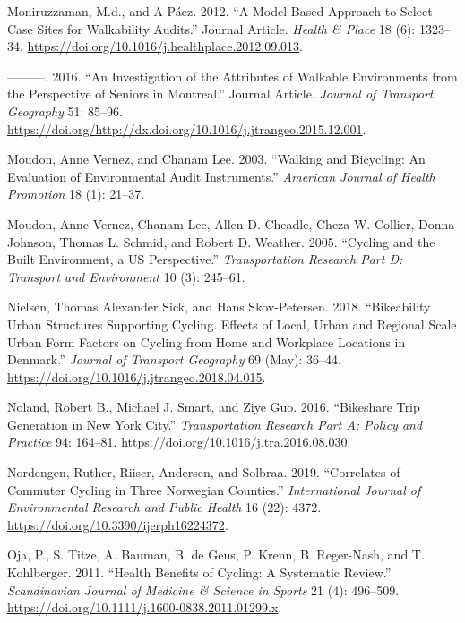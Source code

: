 \documentclass[smallextended]{svjour3}       %
\begin{document}
\leavevmode\hypertarget{ref-Moniruzzaman2012}{}%
Moniruzzaman, M.d., and A Páez. 2012. ``A Model-Based Approach to Select
Case Sites for Walkability Audits.'' Journal Article. \emph{Health \&
Place} 18 (6): 1323--34.
\url{https://doi.org/10.1016/j.healthplace.2012.09.013}.

\leavevmode\hypertarget{ref-Moniruzzaman2016}{}%
---------. 2016. ``An Investigation of the Attributes of Walkable
Environments from the Perspective of Seniors in Montreal.'' Journal
Article. \emph{Journal of Transport Geography} 51: 85--96.
\url{https://doi.org/http://dx.doi.org/10.1016/j.jtrangeo.2015.12.001}.

\leavevmode\hypertarget{ref-Moudon2003walking}{}%
Moudon, Anne Vernez, and Chanam Lee. 2003. ``Walking and Bicycling: An
Evaluation of Environmental Audit Instruments.'' \emph{American Journal
of Health Promotion} 18 (1): 21--37.

\leavevmode\hypertarget{ref-moudonCyclingBuiltEnvironment2005a}{}%
Moudon, Anne Vernez, Chanam Lee, Allen D. Cheadle, Cheza W. Collier,
Donna Johnson, Thomas L. Schmid, and Robert D. Weather. 2005. ``Cycling
and the Built Environment, a US Perspective.'' \emph{Transportation
Research Part D: Transport and Environment} 10 (3): 245--61.

\leavevmode\hypertarget{ref-Nielsen2018}{}%
Nielsen, Thomas Alexander Sick, and Hans Skov-Petersen. 2018.
``Bikeability Urban Structures Supporting Cycling. Effects of Local,
Urban and Regional Scale Urban Form Factors on Cycling from Home and
Workplace Locations in Denmark.'' \emph{Journal of Transport Geography}
69 (May): 36--44. \url{https://doi.org/10.1016/j.jtrangeo.2018.04.015}.

\leavevmode\hypertarget{ref-nolandBikeshareTripGeneration2016}{}%
Noland, Robert B., Michael J. Smart, and Ziye Guo. 2016. ``Bikeshare
Trip Generation in New York City.'' \emph{Transportation Research Part
A: Policy and Practice} 94: 164--81.
\url{https://doi.org/10.1016/j.tra.2016.08.030}.

\leavevmode\hypertarget{ref-Nordengen2019}{}%
Nordengen, Ruther, Riiser, Andersen, and Solbraa. 2019. ``Correlates of
Commuter Cycling in Three Norwegian Counties.'' \emph{International
Journal of Environmental Research and Public Health} 16 (22): 4372.
\url{https://doi.org/10.3390/ijerph16224372}.

\leavevmode\hypertarget{ref-Oja2011}{}%
Oja, P., S. Titze, A. Bauman, B. de Geus, P. Krenn, B. Reger-Nash, and
T. Kohlberger. 2011. ``Health Benefits of Cycling: A Systematic
Review.'' \emph{Scandinavian Journal of Medicine \& Science in Sports}
21 (4): 496--509.
\url{https://doi.org/10.1111/j.1600-0838.2011.01299.x}.
\end{document}
